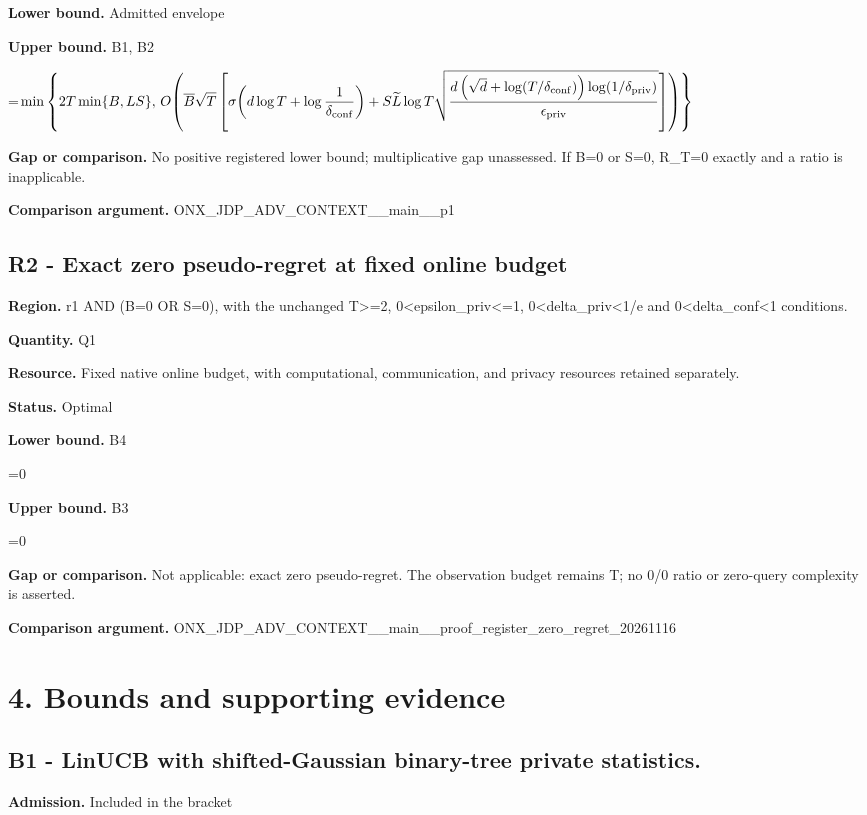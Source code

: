 \documentclass[10pt,a4paper]{article}
\newcommand{\AtlasMath}[1]{\par\begingroup\centering\setbox0=\hbox{$\displaystyle #1$}\ifdim\wd0>1.4\linewidth\typeout{ATLAS WIDE FORMULA: \the\wd0}\fi\ifdim\wd0>\linewidth\resizebox{\linewidth}{!}{\box0}\else\box0\fi\par\endgroup}
\begin{document}
\textbf{Lower bound.} Admitted envelope

\textbf{Upper bound.} B1, B2

\AtlasMath{\min\left\{2T\min\{B,LS\},\,O\!\left(\overline B\sqrt T\left[\sigma\!\left(d\log T+\log\frac1{\delta_{\rm conf}}\right)+S\widetilde{L}\log T\sqrt{\frac{d\left(\sqrt d+\log(T/\delta_{\rm conf})\right)\log(1/\delta_{\rm priv})}{\epsilon_{\rm priv}}}\right]\right)\right\}}
\textbf{Gap or comparison.} No positive registered lower bound; multiplicative gap unassessed. If B=0 or S=0, R\_\allowbreak{}T=0 exactly and a ratio is inapplicable.

\textbf{Comparison argument.} ONX\_\allowbreak{}JDP\_\allowbreak{}ADV\_\allowbreak{}CONTEXT\_\allowbreak{}\_\allowbreak{}main\_\allowbreak{}\_\allowbreak{}p1

\subsection{R2 - Exact zero pseudo-regret at fixed online budget}
\textbf{Region.} r1 AND (B=0 OR S=0), with the unchanged T>=2, 0<epsilon\_\allowbreak{}priv<=1, 0<delta\_\allowbreak{}priv<1/e and 0<delta\_\allowbreak{}conf<1 conditions.

\textbf{Quantity.} Q1

\textbf{Resource.} Fixed native online budget, with computational, communication, and privacy resources retained separately.

\textbf{Status.} Optimal

\textbf{Lower bound.} B4

\AtlasMath{0}
\textbf{Upper bound.} B3

\AtlasMath{0}
\textbf{Gap or comparison.} Not applicable: exact zero pseudo-regret. The observation budget remains T; no 0/0 ratio or zero-query complexity is asserted.

\textbf{Comparison argument.} ONX\_\allowbreak{}JDP\_\allowbreak{}ADV\_\allowbreak{}CONTEXT\_\allowbreak{}\_\allowbreak{}main\_\allowbreak{}\_\allowbreak{}proof\_\allowbreak{}register\_\allowbreak{}zero\_\allowbreak{}regret\_\allowbreak{}20261116

\section{4. Bounds and supporting evidence}
\subsection{B1 - LinUCB with shifted-Gaussian binary-tree private statistics.}
\textbf{Admission.} Included in the bracket
\end{document}
